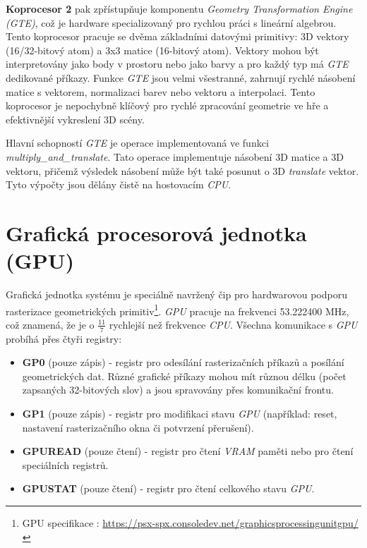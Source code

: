 \textbf{Koprocesor 2} pak zpřístupňuje komponentu \textit{Geometry Transformation Engine (GTE)}, což je hardware specializovaný pro rychlou práci s lineární algebrou. 
Tento koprocesor pracuje se dvěma základními datovými primitivy: 3D vektory (16/32-bitový atom) a 3x3 matice (16-bitový atom). 
Vektory mohou být interpretovány jako body v prostoru nebo jako barvy a pro každý typ má \textit{GTE} dedikované příkazy. 
Funkce \textit{GTE} jsou velmi všestranné, zahrnují rychlé násobení matice s vektorem, normalizaci barev nebo vektoru a interpolaci. 
Tento koprocesor je nepochybně klíčový pro rychlé zpracování geometrie ve hře a efektivnější vykreslení 3D scény.

Hlavní schopností \textit{GTE} je operace implementovaná ve funkci \textit{multiply\_and\_translate}. Tato operace
implementuje násobení 3D matice a 3D vektoru, přičemž výsledek násobení může být také posunut o 3D \textit{translate} vektor. Tyto výpočty jsou dělány čistě na hostovacím \textit{CPU}.

\section{Grafická procesorová jednotka (GPU)}

Grafická jednotka systému je speciálně navržený čip pro hardwarovou podporu rasterizace geometrických primitiv\footnote{GPU specifikace \cite{PSXSpec}: \url{https://psx-spx.consoledev.net/graphicsprocessingunitgpu/}}.
\textit{GPU} pracuje na frekvenci 53.222400 MHz, což znamená, že je o $\frac{11}{7}$ rychlejší než frekvence \textit{CPU}. Všechna komunikace s \textit{GPU} probíhá přes
čtyři registry:

\begin{itemize}
\item{\textbf{GP0} (pouze zápis) - registr pro odesílání rasterizačních příkazů a posílání geometrických dat. Různé grafické příkazy mohou mít různou délku (počet zapsaných 32-bitových slov) a jsou spravovány přes komunikační frontu.}
\item{\textbf{GP1} (pouze zápis) - registr pro modifikaci stavu \textit{GPU} (například: reset, nastavení rasterizačního okna či potvrzení přerušení).}
\item{\textbf{GPUREAD} (pouze čtení) - registr pro čtení \textit{VRAM} paměti nebo pro čtení speciálních registrů.}
\item{\textbf{GPUSTAT} (pouze čtení) - registr pro čtení celkového stavu \textit{GPU}.}
\end{itemize}

